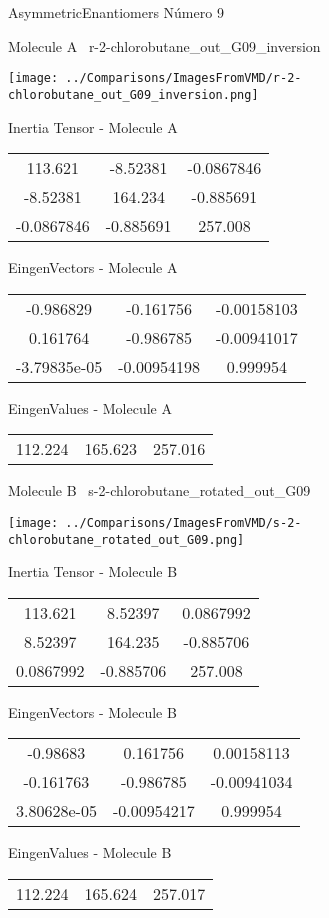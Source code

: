 \vtab[-3cm]
\begin{center}
{\large AsymmetricEnantiomers \tab Número 9}
\end{center}
\begin{multicols}{2}
\begin{center}

Molecule A \
r-2-chlorobutane\_out\_G09\_inversion

\texttt{[image: ../Comparisons/ImagesFromVMD/r-2-chlorobutane\_out\_G09\_inversion.png]}

Inertia Tensor - Molecule A \\
\begin{tabular}{|c c c|}
113.621	 & 	-8.52381	 & 	-0.0867846	 \\
-8.52381	 & 	164.234	 & 	-0.885691	 \\
-0.0867846	 & 	-0.885691	 & 	257.008
\end{tabular}

\vtab
 EingenVectors - Molecule A     \\
\begin{tabular}{|c c c|}
-0.986829	 & 	-0.161756	 & 	-0.00158103	 \\
0.161764	 & 	-0.986785	 & 	-0.00941017	 \\
-3.79835e-05	 & 	-0.00954198	 & 	0.999954
\end{tabular}

\vtab
 EingenValues - Molecule A     \\
\begin{tabular}{|c c c|}
112.224	 & 	165.623	 & 	257.016	 \\
\end{tabular}
\columnbreak

Molecule B \
s-2-chlorobutane\_rotated\_out\_G09

\texttt{[image: ../Comparisons/ImagesFromVMD/s-2-chlorobutane\_rotated\_out\_G09.png]}

Inertia Tensor - Molecule B \\
\begin{tabular}{|c c c|}
113.621	 & 	8.52397	 & 	0.0867992	 \\
8.52397	 & 	164.235	 & 	-0.885706	 \\
0.0867992	 & 	-0.885706	 & 	257.008
\end{tabular}

\vtab
 EingenVectors - Molecule B     \\
\begin{tabular}{|c c c|}
-0.98683	 & 	0.161756	 & 	0.00158113	 \\
-0.161763	 & 	-0.986785	 & 	-0.00941034	 \\
3.80628e-05	 & 	-0.00954217	 & 	0.999954
\end{tabular}

\vtab
 EingenValues - Molecule B     \\
\begin{tabular}{|c c c|}
112.224	 & 	165.624	 & 	257.017	 \\
\end{tabular}

\end{center}
\end{multicols}

